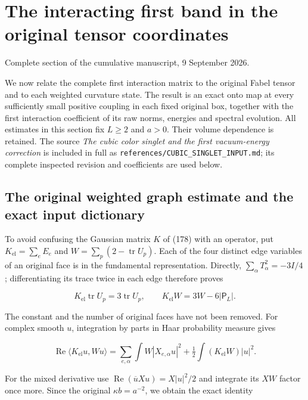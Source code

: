 \section{The interacting first band in the original tensor
coordinates}\label{interacting-tensor-band-md-the-interacting-first-band-in-the-original-tensor-coordinates}

Complete section of the cumulative manuscript, 9 September 2026.

We now relate the complete first interaction matrix to the original
Fabel tensor and to each weighted curvature state. The result is an
exact onto map at every sufficiently small positive coupling in each
fixed original box, together with the first interaction coefficient of
its raw norms, energies and spectral evolution. All estimates in this
section fix \(L\ge2\) and \(a>0\). Their volume dependence is retained.
The source \emph{The cubic color singlet and the first vacuum-energy
correction} is included in full as
\texttt{references/CUBIC\_SINGLET\_INPUT.md}; its complete inspected
revision and coefficients are used below.

\subsection{The original weighted graph estimate and the exact input
dictionary}\label{interacting-tensor-band-md-the-original-weighted-graph-estimate-and-the-exact-input-dictionary}

To avoid confusing the Gaussian matrix \(K\) of (178) with an operator,
put \(K_{\mathrm{el}}=\sum_eE_e\) and
\(W=\sum_p(2-\operatorname{tr}U_p)\). Each of the four distinct edge
variables of an original face is in the fundamental representation.
Directly, \(\sum_\alpha T_\alpha^2=-3I/4\); differentiating its trace
twice in each edge therefore proves

\[
K_{\mathrm{el}}\operatorname{tr}U_p=3\operatorname{tr}U_p,
 \qquad K_{\mathrm{el}}W=3W-6|\mathsf P_L|.
\]

The constant and the number of original faces have not been removed. For
complex smooth \(u\), integration by parts in Haar probability measure
gives

\[
\operatorname{Re}\langle K_{\mathrm{el}}u,Wu\rangle
 =\sum_{e,\alpha}\int W|X_{e,\alpha}u|^2
       +\tfrac12\int(K_{\mathrm{el}}W)|u|^2.
\]

For the mixed derivative use
\(\operatorname{Re}(\overline u Xu)=X|u|^2/2\) and integrate its \(XW\)
factor once more. Since the original \(\kappa b=a^{-2}\), we obtain the
exact identity

